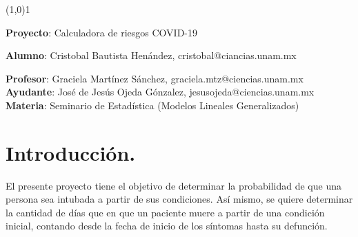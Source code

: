 \documentclass[12pt,a4paper,oneside]{article}
\begin{document}
\vspace{8cm}
\begin{center}

\line(1,0){1}

\vspace{3cm}
\begin{huge}
\textbf{Proyecto}: Calculadora de riesgos COVID-19\\
\end{huge}
\vspace{0.75cm}

\begin{large}
\textbf{Alumno}: Cristobal Bautista Henández, cristobal@ciancias.unam.mx\\
\end{large}
\vspace{0.4cm}

\begin{large}
\textbf{Profesor}: Graciela Martínez Sánchez, graciela.mtz@ciencias.unam.mx\\

\vspace{0.1cm}
\textbf{Ayudante}: José de Jesús Ojeda Gónzalez, jesusojeda@ciencias.unam.mx\\

\vspace{0.2cm}
\textbf{Materia}: Seminario de Estadística (Modelos Lineales Generalizados)\\

\vspace{1.5cm}

\begin{figure}[h]
\centering
{}
\hspace{4cm}
\end{figure}

\end{large}
\end{center}

\newpage

\section{Introducción.}
El presente proyecto tiene el objetivo de determinar la probabilidad de que una persona sea intubada a partir de sus condiciones. Así mismo, se quiere determinar la cantidad de días que en que un paciente muere a partir de una condición inicial, contando desde la fecha de inicio de los síntomas hasta su defunción.
\end{document}
